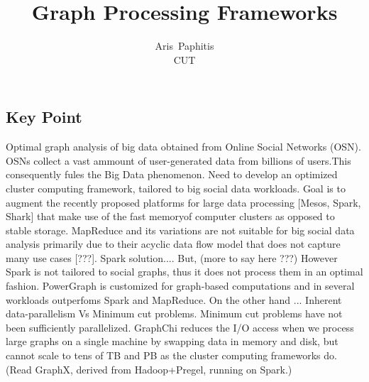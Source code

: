 \documentclass[letterpaper,twocolumn,10pt]{article}
\begin{document}
\date{}

\title{\Large \bf Graph Processing Frameworks}
\author{
{\rm Aris\ Paphitis}\\
CUT
} %

\maketitle

\thispagestyle{empty}


\subsection*{Key Point}
Optimal graph analysis of big data obtained from Online Social Networks (OSN). OSNs collect a vast ammount of user-generated data from billions of users.This consequently fules the Big Data phenomenon. 
Need to develop an optimized cluster computing framework, tailored to big social data workloads.
Goal is to augment the recently proposed platforms for large data processing [Mesos, Spark, Shark] that make use of the fast memoryof computer clusters as opposed to stable storage.
MapReduce and its variations are not suitable for big social data analysis primarily due to their acyclic data flow model that does not capture many use cases [???].
Spark solution....
But, (more to say here ???)
However Spark is not tailored to social graphs, thus it does not process them in an optimal fashion. PowerGraph is customized for graph-based computations and in several workloads outperfoms Spark and MapReduce. On the other hand ... Inherent data-parallelism Vs Minimum cut problems. Minimum cut problems have not been sufficiently parallelized.
GraphChi reduces the I/O access when we process large graphs on a single machine by swapping data in memory and disk, but cannot scale to tens of TB and PB as the cluster computing frameworks do.
(Read GraphX, derived from Hadoop+Pregel, running on Spark.)
\end{document}

